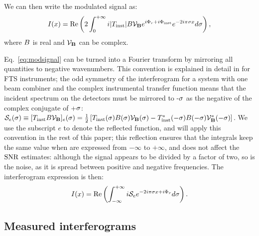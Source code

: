  We can then write the modulated signal as:
\begin{equation}
I(x) = \textrm{Re}\left( 2\int_{0}^{+\infty} i |T_{\textrm{inst}}| B \mathcal{V}_{\mathbf{B}} e^{i\Phi_r + i\Phi_{\textrm{inst}}} e^{-2i\pi \sigma x}d\sigma \right),
\label{eq:modsignal}
\end{equation}
where $B$ is real and $\mathcal{V}_{\mathbf{B}}$ can be complex.

Eq.~\ref{eq:modsignal} can be turned into a Fourier transform by mirroring all quantities to negative wavenumbers. This
convention is explained in detail in \citet{Davis:2001tr} for FTS instruments; the odd symmetry of the interferogram for a system with one beam combiner
and the complex instrumental transfer function means that the incident spectrum on the detectors
must be mirrored to -$\sigma$ as the negative of the complex conjugate of +$\sigma$: 
$\mathcal{S}_e(\sigma) \equiv [T_{\textrm{inst}} B \mathcal{V}_{\mathbf{B}}]_e(\sigma) = {1 \over 2}\left[T_{\textrm{inst}}(\sigma) B(\sigma) \mathcal{V}_{\mathbf{B}}(\sigma) - T^*_{\textrm{inst}}(-\sigma) B(-\sigma) \mathcal{V}_{\mathbf{B}}^*(-\sigma)\right]$. 
We use the subscript $e$ to denote the reflected function, and will apply this convention in the rest of this paper; this reflection ensures that the integrals keep the same value when are expressed from $-\infty$ to $+\infty$, and does not affect the $\textrm{SNR}$ estimates: although the signal appears to be divided by a factor of two, so is the noise, as it is spread between positive and negative frequencies.
The interferogram expression is then:
\begin{equation}
I(x) = \real\left( \int_{-\infty}^{+\infty} i \S_e  e^{-2i\pi \s x + i\Phir} d\s \right).%
\label{eq:interfero2}
\end{equation}
\subsection{Measured interferograms}

